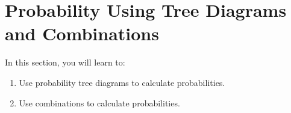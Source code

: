 \section{Probability Using Tree Diagrams and Combinations}\label{section_probability_tree_and_combinations}

In this section, you will learn to:
\begin{enumerate}
    \item Use probability tree diagrams to calculate probabilities.
    \item Use combinations to calculate probabilities.
\end{enumerate}
